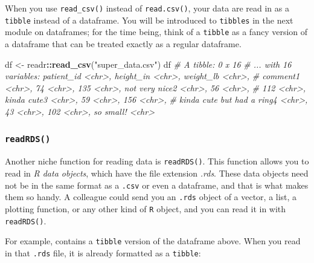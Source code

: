 \documentclass[
]{book}
\newenvironment{Shaded}{\begin{snugshade}}{\end{snugshade}}
\newcommand{\CommentTok}[1]{\textcolor[rgb]{0.56,0.35,0.01}{\textit{#1}}}
\newcommand{\KeywordTok}[1]{\textcolor[rgb]{0.13,0.29,0.53}{\textbf{#1}}}
\newcommand{\NormalTok}[1]{#1}
\newcommand{\OperatorTok}[1]{\textcolor[rgb]{0.81,0.36,0.00}{\textbf{#1}}}
\newcommand{\StringTok}[1]{\textcolor[rgb]{0.31,0.60,0.02}{#1}}
\begin{document}
When you use \texttt{read\_csv()} instead of \texttt{read.csv()}, your data are read in as a \texttt{tibble} instead of a dataframe. You will be introduced to \texttt{tibbles} in the next module on dataframes; for the time being, think of a \texttt{tibble} as a fancy version of a dataframe that can be treated exactly as a regular dataframe.

\begin{Shaded}
\begin{Highlighting}[]
\NormalTok{df <-}\StringTok{ }\NormalTok{readr}\OperatorTok{::}\KeywordTok{read_csv}\NormalTok{(}\StringTok{"super_data.csv"}\NormalTok{)}
\NormalTok{df}
\CommentTok{# A tibble: 0 x 16}
\CommentTok{# ... with 16 variables: patient_id <chr>, height_in <chr>, weight_lb <chr>,}
\CommentTok{#   comment1 <chr>, 74 <chr>, 135 <chr>, not very nice2 <chr>, 56 <chr>,}
\CommentTok{#   112 <chr>, kinda cute3 <chr>, 59 <chr>, 156 <chr>,}
\CommentTok{#   kinda cute but had a ring4 <chr>, 43 <chr>, 102 <chr>, so small! <chr>}
\end{Highlighting}
\end{Shaded}

\hypertarget{readrds}{%
\subsubsection*{\texorpdfstring{\texttt{readRDS()}}{readRDS()}}\label{readrds}}

Another niche function for reading data is \texttt{readRDS()}. This function allows you to read in \emph{R data objects}, which have the file extension \emph{.rds}. These data objects need not be in the same format as a \texttt{.csv} or even a dataframe, and that is what makes them so handy. A colleague could send you an \texttt{.rds} object of a vector, a list, a plotting function, or any other kind of \texttt{R} object, and you can read it in with \texttt{readRDS()}.

For example, contains a \texttt{tibble} version of the dataframe above. When you read in that \texttt{.rds} file, it is already formatted as a \texttt{tibble}:
\end{document}
